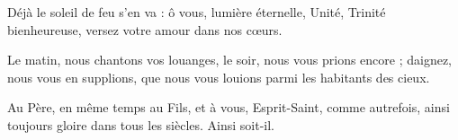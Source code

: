 Déjà le soleil de feu s’en va :
ô vous, lumière éternelle, Unité,
Trinité bienheureuse, versez
votre amour dans nos cœurs.

Le matin, nous chantons vos louanges,
le soir, nous vous prions encore ;
daignez, nous vous en supplions,
que nous vous louions parmi les habitants des cieux.

Au Père, en même temps au Fils,
et à vous, Esprit-Saint,
comme autrefois, ainsi toujours
gloire dans tous les siècles.
Ainsi soit-il.